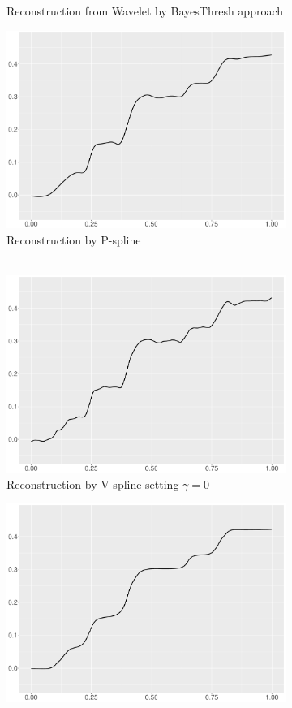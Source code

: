 \begin{figure}
\begin{subfigure}{0.45\textwidth}
    \caption{Reconstruction from Wavelet by BayesThresh approach}
    \end{subfigure}
    \begin{subfigure}{0.45\textwidth}
    \centering
    \includegraphics[width=\linewidth,height=0.45\textwidth]{Chapters/02TractorSplineTheory/plot/ggplot/ggBumpsPSpline.pdf}
    \caption{Reconstruction by P-spline \\ \mbox{  } }
    \end{subfigure}
    \begin{subfigure}{0.45\textwidth}
    \centering
    \includegraphics[width=\linewidth,height=0.45\textwidth]{Chapters/02TractorSplineTheory/plot/ggplot/ggBumpsGamma.pdf}
    \caption{Reconstruction by V-spline setting $\gamma=0$}
    \end{subfigure}
  \begin{subfigure}{0.45\textwidth}
    \centering
    \includegraphics[width=\linewidth,height=0.45\textwidth]{Chapters/02TractorSplineTheory/plot/ggplot/ggBumpsTractorAPT.pdf}

\end{subfigure}
\end{figure}
